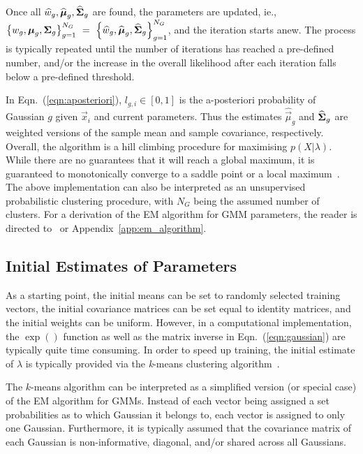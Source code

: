 \noindent
Once all $\widehat{w}_g, \widehat{{\boldsymbol{\mu}}}_g, \widehat{{\boldsymbol{\Sigma}}}_g$ are found, the parameters are updated,
ie., $\left\{ w_g, {\boldsymbol{\mu}}_g, {\boldsymbol{\Sigma}}_g \right\}_{g=1}^{N_G} ~ = ~ \left\{ \widehat{w}_g, \widehat{{\boldsymbol{\mu}}}_g, \widehat{{\boldsymbol{\Sigma}}}_g \right\}_{g=1}^{N_G}$,
and the iteration starts anew.
The process is typically repeated until the number of iterations has reached a pre-defined number,
and/or the increase in the overall likelihood after each iteration falls below a pre-defined threshold.

\noindent In Eqn.~(\ref{eqn:aposteriori}), $l_{g,i} \in [0,1]$ is the {a-posteriori} probability of Gaussian $g$ given $\Vec{x}_i$ and current parameters.
Thus the estimates $\widehat{\Vec{\mu}}_g$ and $\widehat{{\boldsymbol{\Sigma}}}_g$ are weighted versions of the
sample mean and sample covariance, respectively.
Overall, the algorithm is a hill climbing procedure for maximising $p(X | \lambda)$.
While there are no guarantees that it will reach a global maximum, it is guaranteed to monotonically converge to a saddle point or a local maximum~\cite{Dempster77,Duda01,Mitchell97}.
The above implementation can also be interpreted as an unsupervised probabilistic clustering procedure,
with $N_G$ being the assumed number of clusters.
For a derivation of the EM algorithm for GMM parameters, the reader is directed to~\cite{Bilmes98, Redner84} or Appendix~\ref{app:em_algorithm}.

\subsection{Initial Estimates of Parameters}
\label{sec:initial_estimate}

As a starting point, the initial means can be set to randomly selected training vectors,
the initial covariance matrices can be set equal to identity matrices, 
and the initial weights can be uniform.
However, in a computational implementation, the $\exp()$ function as well as the matrix inverse in Eqn.~(\ref{eqn:gaussian}) are typically quite time consuming.
In order to speed up training, the initial estimate of $\lambda$ is typically provided via the {\it k}-means clustering algorithm~\cite{Duda01}.

The $k$-means algorithm can be interpreted as a simplified version (or special case) of the EM algorithm for GMMs.
Instead of each vector being assigned a set probabilities as to which Gaussian it belongs to,
each vector is assigned to only one Gaussian.
Furthermore, it is typically assumed that the covariance matrix of each Gaussian is non-informative, diagonal, and/or shared across all Gaussians.

